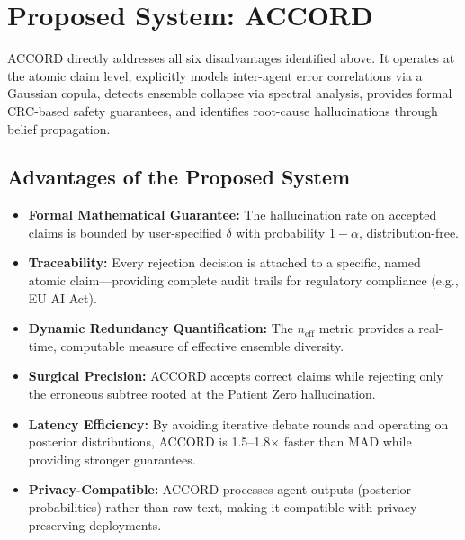 \documentclass[12pt,a4paper]{report}
\begin{document}
\section{Proposed System: ACCORD}

ACCORD directly addresses all six disadvantages identified above. It operates at the atomic claim level, explicitly models inter-agent error correlations via a Gaussian copula, detects ensemble collapse via spectral analysis, provides formal CRC-based safety guarantees, and identifies root-cause hallucinations through belief propagation.

\subsection{Advantages of the Proposed System}

\begin{itemize}
    \item \textbf{Formal Mathematical Guarantee:} The hallucination rate on accepted claims is bounded by user-specified $\delta$ with probability $1 - \alpha$, distribution-free.
    \item \textbf{Traceability:} Every rejection decision is attached to a specific, named atomic claim---providing complete audit trails for regulatory compliance (e.g., EU AI Act).
    \item \textbf{Dynamic Redundancy Quantification:} The $n_{\text{eff}}$ metric provides a real-time, computable measure of effective ensemble diversity.
    \item \textbf{Surgical Precision:} ACCORD accepts correct claims while rejecting only the erroneous subtree rooted at the Patient Zero hallucination.
    \item \textbf{Latency Efficiency:} By avoiding iterative debate rounds and operating on posterior distributions, ACCORD is 1.5--1.8$\times$ faster than MAD while providing stronger guarantees.
    \item \textbf{Privacy-Compatible:} ACCORD processes agent outputs (posterior probabilities) rather than raw text, making it compatible with privacy-preserving deployments.
\end{itemize}
\end{document}
